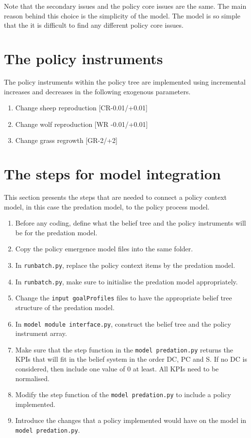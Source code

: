 \documentclass[12pt]{article}
\begin{document}
Note that the secondary issues and the policy core issues are the same. The main reason behind this choice is the simplicity of the model. The model is so simple that the it is difficult to find any different policy core issues.

\section{The policy instruments}
\label{sec:interfaceInstruments}

The policy instruments within the policy tree are implemented using incremental increases and decreases in the following exogenous parameters.

\begin{enumerate}
\item Change sheep reproduction [CR-0.01/+0.01]
\item Change wolf reproduction [WR -0.01/+0.01]
\item Change grass regrowth [GR-2/+2]
\end{enumerate}



\section{The steps for model integration}
\label{sec:steps}

This section presents the steps that are needed to connect a policy context model, in this case the predation model, to the policy process model.

\begin{enumerate}
\item Before any coding, define what the belief tree and the policy instruments will be for the predation model.
\item Copy the policy emergence model files into the same folder.
\item In \texttt{runbatch.py}, replace the policy context items by the predation model.
\item In \texttt{runbatch.py}, make sure to initialise the predation model appropriately.
\item Change the \texttt{input goalProfiles} files to have the appropriate belief tree structure of the predation model.
\item In \texttt{model module interface.py}, construct the belief tree and the policy instrument array.
\item Make sure that the step function in the \texttt{model predation.py} returns the KPIs that will fit in the belief system in the order DC, PC and S. If no DC is considered, then include one value of 0 at least. All KPIs need to be normalised.
\item Modify the step function of the \texttt{model predation.py} to include a policy implemented.
\item Introduce the changes that a policy implemented would have on the model in \texttt{model predation.py}.
\end{enumerate}
\end{document}
